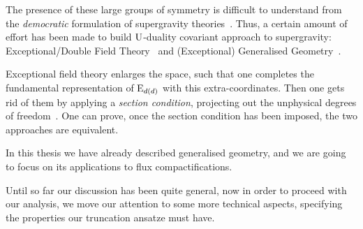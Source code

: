 \documentclass[debug]{phd}
\begin{document}
				The presence of these large groups of symmetry is difficult to understand from the \emph{democratic} formulation of supergravity theories~\cite{DemSugra}.
				Thus, a certain amount of effort has been made to build $\mathrm{U}$-duality covariant approach to supergravity: Exceptional/Double Field Theory~\cite{hull2, samt1, samt2} and (Exceptional) Generalised Geometry~\cite{Gualtieri:2003dx, hull1, waldram1, waldram2, waldram3, waldram4}.
				
				Exceptional field theory enlarges the space, such that one completes the fundamental representation of $\mathrm{E}_{d(d)}$ with this extra-coordinates.
				Then one gets rid of them by applying a \emph{section condition}, projecting out the unphysical degrees of freedom~\cite{samt1, samt2}.
				One can prove, once the section condition has been imposed, the two approaches are equivalent.
				
				In this thesis we have already described generalised geometry, and we are going to focus on its applications to flux compactifications.
				
				Until so far our discussion has been quite general, now in order to proceed with our analysis, we move our attention to some more technical aspects, specifying the properties our truncation ansatze must have.
%			
%			
\end{document}
